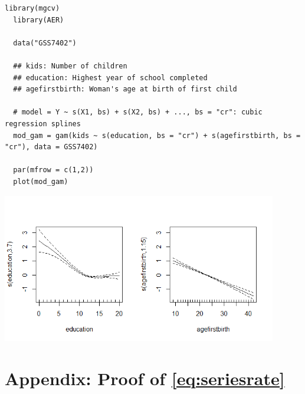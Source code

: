 \documentclass[10.5pt, A4paper, openany, uplatex]{book}
\numberwithin{equation}{section}
\begin{document}
\begin{lstlisting}[basicstyle=\ttfamily\footnotesize, frame=single]
  library(mgcv)
  library(AER)
   
  data("GSS7402")
   
  ## kids: Number of children
  ## education: Highest year of school completed
  ## agefirstbirth: Woman's age at birth of first child
   
  # model = Y ~ s(X1, bs) + s(X2, bs) + ..., bs = "cr": cubic regression splines
  mod_gam = gam(kids ~ s(education, bs = "cr") + s(agefirstbirth, bs = "cr"), data = GSS7402)

  par(mfrow = c(1,2))
  plot(mod_gam) 
\end{lstlisting}

\begin{center}
	\includegraphics[width = 12cm]{gam.png}
\end{center}

\section*{Appendix: Proof of \eqref{eq:seriesrate}}
\end{document}
